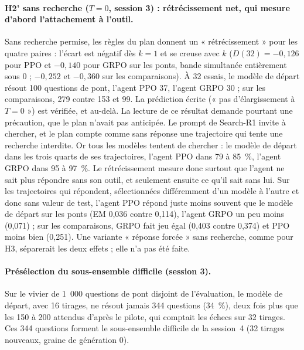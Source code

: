 \paragraph{H2' sans recherche ($T = 0$, session 3) : rétrécissement net, qui mesure d'abord l'attachement à l'outil.} Sans recherche permise, les règles du plan donnent un « rétrécissement » pour les quatre paires : l'écart est négatif dès $k = 1$ et se creuse avec $k$ ($D(32) = -0{,}126$ pour PPO et $-0{,}140$ pour GRPO sur les ponts, bande simultanée entièrement sous 0 ; $-0{,}252$ et $-0{,}360$ sur les comparaisons). À 32 essais, le modèle de départ résout 100 questions de pont, l'agent PPO 37, l'agent GRPO 30 ; sur les comparaisons, 279 contre 153 et 99. La prédiction écrite (« pas d'élargissement à $T = 0$ ») est vérifiée, et au-delà. La lecture de ce résultat demande pourtant une précaution, que le plan n'avait pas anticipée. Le prompt de Search-R1 invite à chercher, et le plan compte comme sans réponse une trajectoire qui tente une recherche interdite. Or tous les modèles tentent de chercher : le modèle de départ dans les trois quarts de ses trajectoires, l'agent PPO dans 79 à 85~\%, l'agent GRPO dans 95 à 97~\%. Le rétrécissement mesure donc surtout que l'agent ne sait plus répondre sans son outil, et seulement ensuite ce qu'il sait sans lui. Sur les trajectoires qui répondent, sélectionnées différemment d'un modèle à l'autre et donc sans valeur de test, l'agent PPO répond juste moins souvent que le modèle de départ sur les ponts (EM 0,036 contre 0,114), l'agent GRPO un peu moins (0,071) ; sur les comparaisons, GRPO fait jeu égal (0,403 contre 0,374) et PPO moins bien (0,251). Une variante « réponse forcée » sans recherche, comme pour H3, séparerait les deux effets ; elle n'a pas été faite.

\paragraph{Présélection du sous-ensemble difficile (session 3).} Sur le vivier de 1~000 questions de pont disjoint de l'évaluation, le modèle de départ, avec 16 tirages, ne résout jamais 344 questions (34~\%), deux fois plus que les 150 à 200 attendus d'après le pilote, qui comptait les échecs sur 32 tirages. Ces 344 questions forment le sous-ensemble difficile de la session~4 (32 tirages nouveaux, graine de génération 0).

